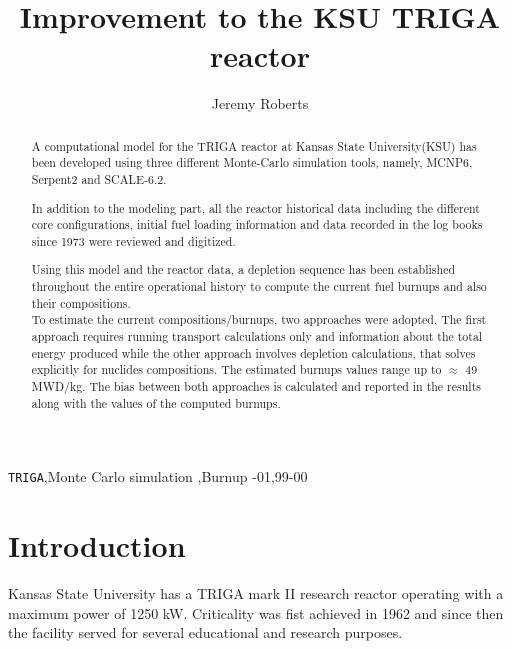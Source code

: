 \documentclass[review]{elsarticle}
\begin{document}
\begin{frontmatter}

\title{Improvement to the KSU TRIGA reactor}

\author{Jeremy Roberts}
\address{Department of Mechanical and Nuclear Engineering, Kansas State University, Manhattan, KS 66506, USA}



\begin{abstract}
A computational model for the TRIGA reactor at Kansas State University(KSU) has been developed using three 
different Monte-Carlo simulation tools, namely, MCNP6, Serpent2 and SCALE-6.2.

In addition to the modeling part, all the reactor historical data including the different core configurations, initial fuel loading information and data recorded in the log books since 1973 were reviewed and digitized.

Using this model and the reactor data, a depletion sequence has been established throughout the entire 
operational history to compute the current fuel burnups and also their compositions.\\
To estimate the current compositions/burnups, two approaches were adopted. The first approach requires running transport calculations only and information about the total energy produced while the other approach involves depletion calculations, that solves explicitly for nuclides compositions. The estimated burnups values range up to $\approx$ 49 MWD/kg. The bias between both approaches is calculated and reported in the results along with the values of the computed burnups.


\end{abstract}

\begin{keyword}
\texttt{TRIGA}\sep Monte Carlo simulation \sep Burnup 
-01\sep  99-00
\end{keyword}
\end{frontmatter}

\linenumbers

\section{Introduction}
Kansas State University has a TRIGA mark II research reactor operating with a maximum power of 1250 kW. Criticality was fist achieved in 1962 and since then the facility served for several educational and research purposes.
\end{document}
